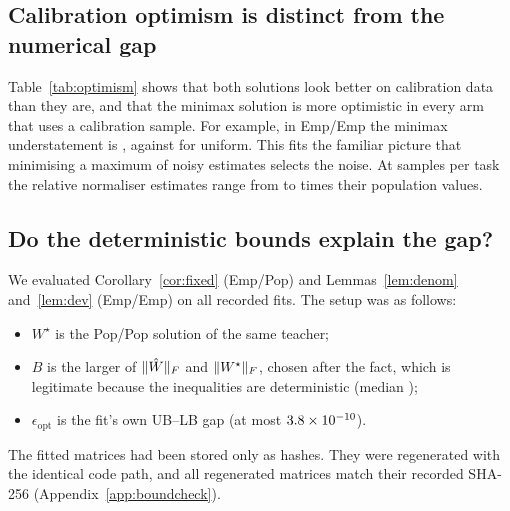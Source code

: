 \subsection{Calibration optimism is distinct from the numerical gap}

\begin{table}[t]
\caption{Fitted objective of the returned solution against its population value, averaged over
the \CfgNewCells{} fresh cells. This is a statistical optimism gap. It is unrelated to the
numerical UB--LB gap of Table~\ref{tab:audit}, which is at most $\STwoMaxGapRel$ in relative terms.}
\label{tab:optimism}
\centering\small

\end{table}

Table~\ref{tab:optimism} shows that both solutions look better on calibration data than they
are, and that the minimax solution is more optimistic in every arm that uses a calibration sample.
For example, in Emp/Emp the minimax understatement is \STwoOptGapEEMinimax, against
\STwoOptGapEEUniform{} for uniform. This fits the familiar picture that minimising a maximum of
noisy estimates selects the noise. At \CfgNcal{} samples per task the relative normaliser
estimates range from \STwoNormRatioMin{} to \STwoNormRatioMax{} times their population values.

\subsection{Do the deterministic bounds explain the gap?}
\label{sec:boundcheck}

We evaluated Corollary~\ref{cor:fixed} (Emp/Pop) and Lemmas~\ref{lem:denom} and~\ref{lem:dev}
(Emp/Emp) on all \SThreeNCells{} recorded fits. The setup was as follows:
\begin{itemize}
\item $W^\star$ is the Pop/Pop solution of the same teacher;
\item $B$ is the larger of $\lVert \hat{W}\rVert_{F}$ and $\lVert W^\star\rVert_{F}$, chosen after the fact, which is
legitimate because the inequalities are deterministic (median \SThreeMedianB);
\item $\epsilon_{\mathrm{opt}}$ is the fit's own UB--LB gap (at most $3.8\times10^{-10}$).
\end{itemize}
The fitted matrices had been stored only as hashes. They were regenerated with the identical code
path, and all \SThreeNRefits{} regenerated matrices match their recorded SHA-256
(Appendix~\ref{app:boundcheck}).

